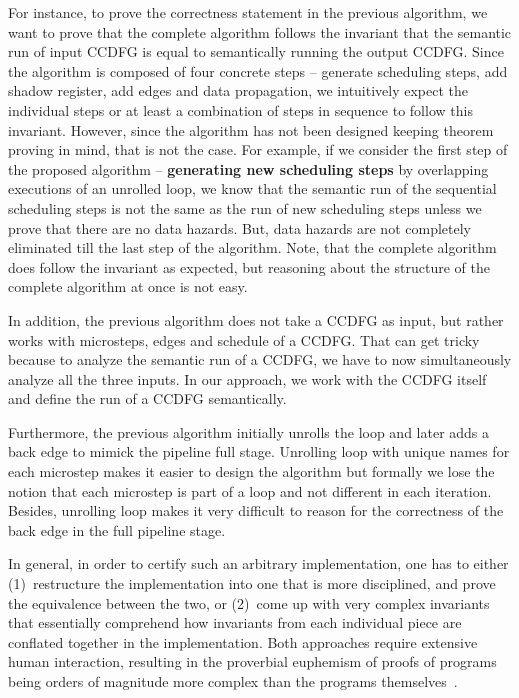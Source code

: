 For instance, to prove the correctness statement in the previous algorithm, 
we want to prove that the complete algorithm follows
the invariant that the semantic run of input CCDFG is equal to semantically running the output CCDFG.
Since the algorithm is composed of four concrete steps -- generate scheduling steps, add shadow register,
add edges and data propagation, we intuitively expect the individual steps or at least a combination of steps in sequence to
follow this invariant. However, since the algorithm has not been designed keeping theorem proving
in mind, that is not the case. For example, if
we consider the first step of the proposed algorithm -- {\bf generating new scheduling steps} by
overlapping executions of an unrolled loop, we know that the semantic run 
of the sequential scheduling steps is not the same as the run of new scheduling steps
unless we prove that there are no data hazards. But, data hazards are not completely eliminated till the last step of the algorithm. Note, that the complete algorithm
does follow the invariant as expected, but reasoning about the structure of the
complete algorithm at once is not easy.

In addition, the previous algorithm does not take a CCDFG as input, but rather
works with microsteps, edges and schedule of a CCDFG. That can get tricky because to analyze the
semantic run of a CCDFG, we have to now simultaneously analyze all the three inputs. In our approach,
we work with the CCDFG itself and define the run of a CCDFG semantically.

Furthermore, the previous algorithm initially unrolls the loop and later adds
a back edge to mimick the pipeline full stage. Unrolling loop with unique names
for each microstep makes it easier to design the algorithm but formally we lose the notion
that each microstep is part of a loop and not different in each iteration.
Besides, unrolling loop makes it very difficult to reason for the correctness of the
back edge in the
full pipeline stage.

In general, in order to certify such an arbitrary implementation,
one has to either (1)~restructure the implementation into
one that is more disciplined, and prove the equivalence
between the two, or (2)~come up with very complex
invariants that essentially comprehend how invariants from
each individual piece are conflated together in the
implementation.  Both approaches require extensive human
interaction, resulting in the proverbial euphemism of proofs
of programs being orders of magnitude more complex than the
programs themselves~\cite{liu}.


